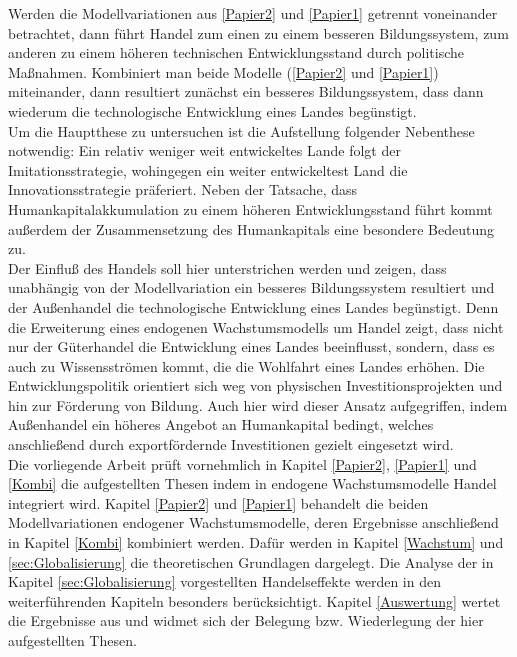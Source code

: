 Werden die Modellvariationen aus \ref{Papier2} und \ref{Papier1} getrennt voneinander betrachtet, dann führt Handel zum einen zu einem besseren Bildungssystem, zum anderen zu einem höheren technischen Entwicklungsstand durch politische Maßnahmen. Kombiniert man beide Modelle (\ref{Papier2} und \ref{Papier1}) miteinander, dann resultiert zunächst ein besseres Bildungssystem, dass dann wiederum die technologische Entwicklung eines Landes begünstigt. \\


Um die Hauptthese zu untersuchen ist die Aufstellung folgender Nebenthese notwendig: Ein relativ weniger weit entwickeltes Lande folgt der Imitationsstrategie, wohingegen ein weiter entwickeltest Land die Innovationsstrategie präferiert. Neben der Tatsache, dass Humankapitalakkumulation zu einem höheren Entwicklungsstand führt kommt außerdem der Zusammensetzung des Humankapitals eine besondere Bedeutung zu. \\


Der Einfluß des Handels soll hier unterstrichen werden und zeigen, dass unabhängig von der Modellvariation ein besseres Bildungssystem resultiert und der Außenhandel die technologische Entwicklung eines Landes begünstigt.
Denn die Erweiterung eines endogenen Wachstumsmodells um Handel zeigt, dass nicht nur der Güterhandel die Entwicklung eines Landes beeinflusst, sondern, dass es auch zu Wissensströmen kommt, die die Wohlfahrt eines Landes erhöhen.
Die Entwicklungspolitik orientiert sich weg von physischen Investitionsprojekten und hin zur Förderung von Bildung. Auch hier wird dieser Ansatz aufgegriffen, indem Außenhandel ein höheres Angebot an Humankapital bedingt, welches anschließend durch exportfördernde Investitionen gezielt eingesetzt wird. \\


Die vorliegende Arbeit prüft vornehmlich in Kapitel \ref{Papier2}, \ref{Papier1} und \ref{Kombi} die aufgestellten Thesen indem in endogene Wachstumsmodelle Handel integriert wird. Kapitel \ref{Papier2} und \ref{Papier1} behandelt die beiden Modellvariationen endogener Wachstumsmodelle, deren Ergebnisse anschließend in Kapitel \ref{Kombi} kombiniert werden. Dafür werden in Kapitel \ref{Wachstum} und \ref{sec:Globalisierung} die theoretischen Grundlagen dargelegt. Die Analyse der in Kapitel \ref{sec:Globalisierung} vorgestellten Handelseffekte werden in den weiterführenden Kapiteln besonders berücksichtigt. Kapitel \ref{Auswertung} wertet die Ergebnisse aus und widmet sich der Belegung bzw. Wiederlegung der hier aufgestellten Thesen.